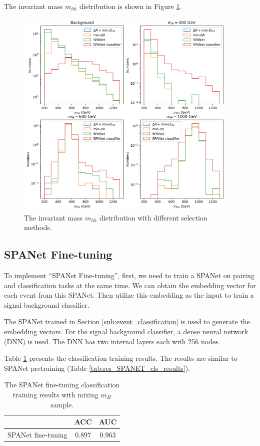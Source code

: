 \documentclass[12pt]{article}
\begin{document}
		The invariant mass $m_{hh}$ distribution is shown in Figure \ref{fig:mhh_distribution}.
		\begin{figure}[htpb]
			\centering
			\includegraphics[width=0.95\textwidth]{mhh_distribution.png}
			\caption{The invariant mass $m_{hh}$ distribution with different selection methods.}
			\label{fig:mhh_distribution}
		\end{figure}
	\subsection{SPANet Fine-tuning}%
	\label{sub:spanet_fine_tuning}
	
		To implement ``SPANet Fine-tuning'', first, we need to train a SPANet on pairing and classification tasks at the same time. We can obtain the embedding vector for each event from this SPANet. Then utilize this embedding as the input to train a signal background classifier.

		The SPANet trained in Section \ref{sub:event_classification} is used to generate the embedding vectors. For the signal background classifier, a dense neural network (DNN) is used. The DNN has two internal layers each with 256 nodes.

		Table \ref{tab:res_SPANET_fine-tuning_results} presents the classification training results. The results are similar to SPANet pretraining (Table \ref{tab:res_SPANET_cls_results}).
		\begin{table}[htpb]
			\centering
			\caption{The SPANet fine-tuning classification training results with mixing $m_H$ sample.}
			\label{tab:res_SPANET_fine-tuning_results}
			\begin{tabular}{c|cc}
			& ACC     & AUC   \\ \hline
			 SPANet fine-tuning & $0.897$ & $0.963$
			\end{tabular}      
		\end{table}
\end{document}
